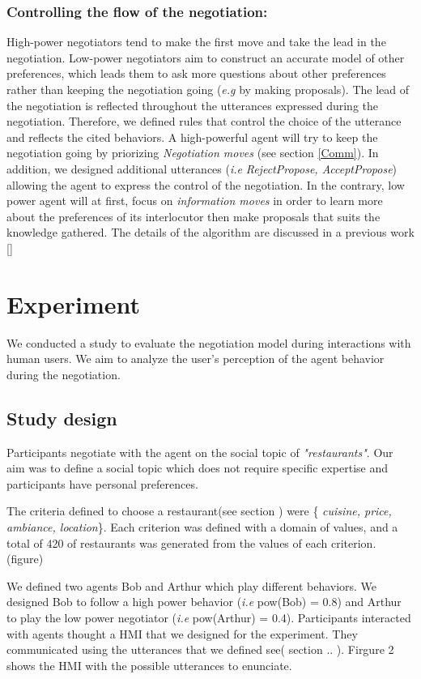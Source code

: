 \documentclass[runningheads,a4paper]{llncs}
\begin{document}
	\subsubsection{Controlling the flow of the negotiation:}
	High-power negotiators tend to make the first move \cite{magee2007power} and take the lead in the negotiation. Low-power negotiators aim to construct an accurate model of other preferences, which leads them to ask more questions about other preferences rather than keeping the negotiation going (\emph{e.g} by making proposals)\cite{de2004influence}.
	The lead of the negotiation is reflected throughout the utterances expressed during the negotiation. Therefore, we defined rules that control the choice of the utterance and reflects the cited behaviors. A high-powerful agent will try to keep the negotiation going by priorizing \emph{Negotiation moves} (see section \ref{Comm}). In addition, we designed additional utterances (\textit{i.e} \emph{RejectPropose, AcceptPropose}) allowing the agent to express the control of the negotiation.
	In the contrary, low power agent will at first, focus on \emph{information moves} in order to learn more about the preferences of its interlocutor then make proposals that suits the knowledge gathered. 
	The details of the algorithm are discussed in a previous work []
	
\section{Experiment}
	We conducted a study to evaluate the negotiation model during interactions with human users. We aim to analyze the user's perception of the agent behavior during the negotiation.
	
	\subsection{Study design}
		
		Participants negotiate with the agent on the social topic of \emph{"restaurants"}. Our aim was to define a social topic which does not require specific expertise and participants have personal preferences.
		
		The criteria defined to choose a restaurant(see section ) were \{ \textit{cuisine, price, ambiance, location}\}. Each criterion was defined with a domain of values, and a total of 420 of restaurants was generated from the values of each criterion. (figure)
		
		We defined two agents Bob and Arthur which play different behaviors. We designed Bob to follow a high power behavior (\textit{i.e} pow(Bob) = 0.8) and Arthur to play the low power negotiator (\textit{i.e} pow(Arthur) = 0.4).
		Participants interacted with agents thought a HMI that we designed for the experiment. They communicated using the utterances that we defined see( section .. ). Firgure 2 shows the HMI with the possible utterances to enunciate.
		
\end{document}
